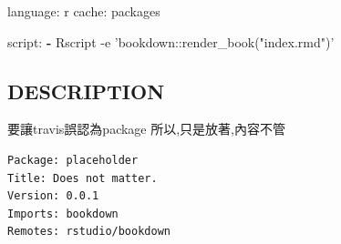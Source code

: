 \documentclass[]{book}
\newenvironment{Shaded}{\begin{snugshade}}{\end{snugshade}}
\newcommand{\AttributeTok}[1]{\textcolor[rgb]{0.77,0.63,0.00}{#1}}
\newcommand{\FunctionTok}[1]{\textcolor[rgb]{0.00,0.00,0.00}{#1}}
\newcommand{\KeywordTok}[1]{\textcolor[rgb]{0.13,0.29,0.53}{\textbf{#1}}}
\theoremstyle{definition}
\theoremstyle{definition}
\theoremstyle{definition}
\theoremstyle{remark}
\begin{document}
\begin{Shaded}
\begin{Highlighting}[]
\FunctionTok{language:}\AttributeTok{ r}
\FunctionTok{cache:}\AttributeTok{ packages}

\FunctionTok{script:}
  \KeywordTok{-} \FunctionTok{Rscript -e 'bookdown:}\AttributeTok{:render_book("index.rmd")'}
\end{Highlighting}
\end{Shaded}

\hypertarget{description}{%
\subsection{DESCRIPTION}\label{description}}

要讓travis誤認為package 所以,只是放著,內容不管

\begin{verbatim}
Package: placeholder
Title: Does not matter.
Version: 0.0.1
Imports: bookdown
Remotes: rstudio/bookdown
\end{verbatim}
\end{document}

